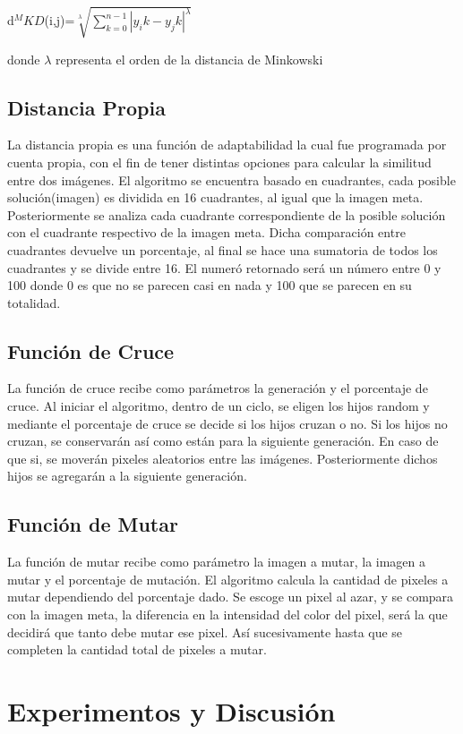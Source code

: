 \documentclass[conference]{C:/Program Files (x86)/MiKTeX 2.9/tex/latex/ltxmisc/IEEEtran}
\begin{document}
\hspace{50pt} d$^MKD$(i,j)=$\sqrt[\lambda]{\sum\limits_{k=0}^{n-1}|y_ik - y_jk|^\lambda}$

donde $\lambda$ representa el orden de la distancia de Minkowski

\subsection{Distancia Propia}
La distancia propia es una función de adaptabilidad la cual fue programada por cuenta propia, con el fin de tener distintas opciones para calcular la similitud entre dos imágenes. El algoritmo se encuentra basado en cuadrantes, cada posible solución(imagen) es dividida en 16 cuadrantes, al igual que la imagen meta. Posteriormente se analiza cada cuadrante correspondiente de la posible solución con el cuadrante respectivo de la imagen meta. Dicha comparación entre cuadrantes devuelve un porcentaje, al final se hace una sumatoria de todos los cuadrantes y se divide entre 16. El numeró retornado será un número entre 0 y 100 donde 0 es que no se parecen casi en nada y 100 que se parecen en su totalidad.

\subsection{Función de Cruce}
La función de cruce recibe como parámetros la generación y el porcentaje de cruce. Al iniciar el algoritmo, dentro de un ciclo, se eligen los hijos random y mediante el porcentaje de cruce se decide si los hijos cruzan o no. Si los hijos no cruzan, se conservarán así como están para la siguiente generación. En caso de que si, se moverán pixeles aleatorios entre las imágenes. Posteriormente dichos hijos se agregarán a la siguiente generación.

\subsection{Función de Mutar}
La función de mutar recibe como parámetro la imagen a mutar, la imagen a mutar y el porcentaje de mutación. El algoritmo calcula la cantidad de pixeles a mutar dependiendo del porcentaje dado. Se escoge un pixel al azar, y se compara con la imagen meta, la diferencia en la intensidad del color del pixel, será la que decidirá que tanto debe mutar ese pixel. Así sucesivamente hasta que se completen la cantidad total de pixeles a mutar.


\section{Experimentos y Discusión}
\end{document}
